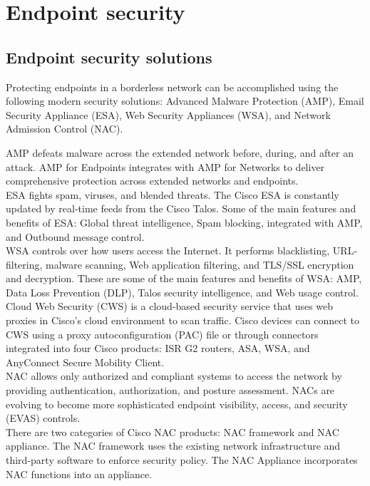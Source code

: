 \chapter{Endpoint security}

\section{Endpoint security solutions}

Protecting endpoints in a borderless network can be accomplished using the following modern security solutions: Advanced Malware Protection (AMP), Email Security Appliance (ESA), Web Security Appliances (WSA), and Network Admission Control (NAC).

AMP defeats malware across the extended network before, during, and after an attack. AMP for Endpoints integrates with AMP for Networks to deliver comprehensive protection across extended networks and endpoints. \\

ESA fights spam, viruses, and blended threats. The Cisco ESA is constantly updated by real-time feeds from the Cisco Talos. Some of the main features and benefits of ESA: Global threat intelligence, Spam blocking, integrated with AMP, and Outbound message control.\\

WSA controls over how users access the Internet. It performs blacklisting, URL-filtering, malware scanning, Web application filtering, and TLS/SSL encryption and decryption. These are some of the main features and benefits of WSA: AMP, Data Loss Prevention (DLP), Talos security intelligence, and Web usage control.\\

Cloud Web Security (CWS) is a cloud-based security service that uses web proxies in Cisco’s cloud environment to scan traffic. Cisco devices can connect to CWS using a proxy autoconfiguration (PAC) file or through connectors integrated into four Cisco products: ISR G2 routers, ASA, WSA, and AnyConnect Secure Mobility Client.\\

NAC allows only authorized and compliant systems to access the network by providing authentication, authorization, and posture assessment. NACs are evolving to become more sophisticated endpoint visibility, access, and security (EVAS) controls.\\

There are two categories of Cisco NAC products: NAC framework and NAC appliance. The NAC framework uses the existing network infrastructure and third-party software to enforce security policy. The NAC Appliance incorporates NAC functions into an appliance.\\

